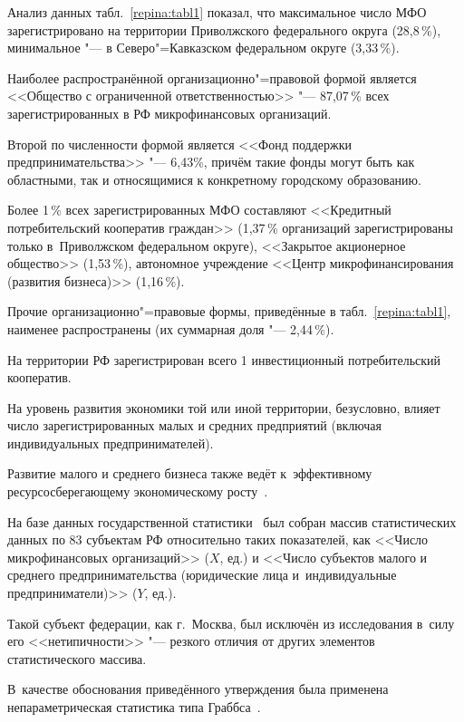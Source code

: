 Анализ данных табл.~\ref{repina:tabl1} показал, что максимальное число МФО зарегистрировано на территории Приволжского федерального округа (28,8\,{\%}), минимальное "--- в Северо"=Кавказском федеральном округе (3,33{\,\%}). 

Наиболее распространённой организационно"=правовой формой является <<Общество с ограниченной ответственностью>> "--- 87,07{\,\%} всех зарегистрированных в РФ микрофинансовых организаций. 

Второй по численности формой является <<Фонд поддержки предпринимательства>> "--- 6,43{\%}, причём такие фонды могут быть как областными, так и относящимися к конкретному городскому образованию. 

Более 1{\,\%} всех зарегистрированных МФО составляют <<Кредитный потребительский кооператив граждан>> (1,37{\,\%} организаций зарегистрированы только в~Приволжском федеральном округе), <<Закрытое акционерное общество>> (1,53{\,\%}), автономное учреждение <<Центр микрофинансирования (развития бизнеса)>> (1,16{\,\%}). 

Прочие организационно"=правовые формы, приведённые в табл.~\ref{repina:tabl1}, наименее распространены (их  суммарная доля "--- 2,44{\,\%}). 

На территории РФ зарегистрирован всего 1 инвестиционный потребительский кооператив.



На уровень развития экономики той или иной территории, безусловно, влияет число зарегистрированных малых и средних предприятий (включая индивидуальных предпринимателей). 

Развитие малого и среднего  бизнеса также ведёт к~эффективному ресурсосберегающему экономическому росту~\cite{repina:bib5}.



На базе данных государственной статистики~\cite{repina:bib2,repina:bib3} был собран массив статистических данных по 83 субъектам РФ относительно таких показателей, как <<Число микрофинансовых организаций>> ($X$, ед.) и <<Число субъектов малого и среднего предпринимательства (юридические лица и~индивидуальные предприниматели)>> ($Y$, ед.).

Такой субъект федерации, как г.~Москва, был исключён из исследования в~силу его <<нетипичности>> "--- резкого отличия от других элементов статистического массива. 

В~качестве обоснования приведённого утверждения была применена непараметрическая статистика типа Граббса~\cite{repina:bib6}. 

